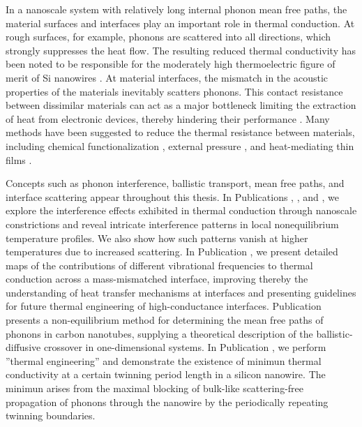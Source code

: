 In a nanoscale system with relatively long internal phonon mean free paths, the material surfaces and interfaces play an important role in thermal conduction. At rough surfaces, for example, phonons are scattered into all directions, which strongly suppresses the heat flow. The resulting reduced thermal conductivity has been noted to be responsible for the moderately high thermoelectric figure of merit of Si nanowires \cite{hochbaum08}. At material interfaces, the mismatch in the acoustic properties of the materials inevitably scatters phonons.  This contact resistance between dissimilar materials can act as a major bottleneck limiting the extraction of heat from electronic devices, thereby hindering their performance \cite{pop10}. Many methods have been suggested to reduce the thermal resistance between materials, including chemical functionalization \cite{hopkins11,kaur14}, external pressure \cite{shen11,chalopin12}, and heat-mediating thin films \cite{english12}. %

Concepts such as phonon interference, ballistic transport, mean free paths, and interface scattering appear throughout this thesis. In Publications , , and , we explore the interference effects exhibited in thermal conduction through nanoscale constrictions and reveal intricate interference patterns in local nonequilibrium temperature profiles. We also show how such patterns vanish at higher temperatures due to increased scattering. In Publication , we present detailed maps of the contributions of different vibrational frequencies to thermal conduction across a mass-mismatched interface, improving thereby the understanding of heat transfer mechanisms at interfaces and presenting guidelines for future thermal engineering of high-conductance interfaces. Publication  presents a non-equilibrium method for determining the mean free paths of phonons in carbon nanotubes, supplying a theoretical description of the ballistic-diffusive crossover in one-dimensional systems. In Publication , we perform ''thermal engineering'' and demonstrate the existence of minimun thermal conductivity at a certain twinning period length in a silicon nanowire. The minimun arises from the maximal blocking of bulk-like scattering-free propagation of phonons through the nanowire by the periodically repeating twinning boundaries.



